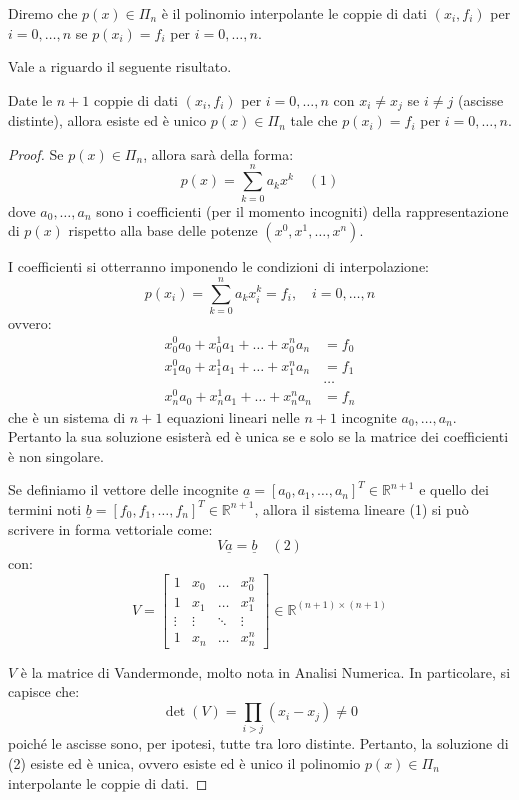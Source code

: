 \begin{definition}
Diremo che $p(x) \in \Pi_n$ è il polinomio interpolante le coppie di dati $(x_i, f_i)$ per $i=0,\dots,n$ se $p(x_i) = f_i$ per $i=0,\dots,n$.
\end{definition}

Vale a riguardo il seguente risultato.

\begin{teorema}
Date le $n+1$ coppie di dati $(x_i, f_i)$ per $i=0,\dots,n$ con $x_i \neq x_j$ se $i \neq j$ (ascisse distinte), allora esiste ed è unico $p(x) \in \Pi_n$ tale che $p(x_i) = f_i$ per $i=0,\dots,n$.
\end{teorema}

\begin{proof}
Se $p(x) \in \Pi_n$, allora sarà della forma:
$$p(x) = \sum_{k=0}^{n} a_k x^k \quad (1)$$
dove $a_0, \dots, a_n$ sono i coefficienti (per il momento incogniti) della rappresentazione di $p(x)$ rispetto alla base delle potenze $(x^0, x^1, \dots, x^n)$. 

I coefficienti si otterranno imponendo le condizioni di interpolazione:
$$p(x_i) = \sum_{k=0}^{n} a_k x_i^k = f_i, \quad i=0,\dots,n$$
ovvero:
\begin{align*}
x_0^0 a_0 + x_0^1 a_1 + \dots + x_0^n a_n &= f_0 \\
x_1^0 a_0 + x_1^1 a_1 + \dots + x_1^n a_n &= f_1 \\
&\dots \\
x_n^0 a_0 + x_n^1 a_1 + \dots + x_n^n a_n &= f_n
\end{align*}
che è un sistema di $n+1$ equazioni lineari nelle $n+1$ incognite $a_0, \dots, a_n$. Pertanto la sua soluzione esisterà ed è unica se e solo se la matrice dei coefficienti è non singolare.

Se definiamo il vettore delle incognite $\underline{a} = [a_0, a_1, \dots, a_n]^T \in \mathbb{R}^{n+1}$ e quello dei termini noti $\underline{b} = [f_0, f_1, \dots, f_n]^T \in \mathbb{R}^{n+1}$, allora il sistema lineare (1) si può scrivere in forma vettoriale come:
$$V \underline{a} = \underline{b} \quad (2)$$
con:
$$V = \begin{bmatrix}
1 & x_0 & \dots & x_0^n \\
1 & x_1 & \dots & x_1^n \\
\vdots & \vdots & \ddots & \vdots \\
1 & x_n & \dots & x_n^n
\end{bmatrix} \in \mathbb{R}^{(n+1) \times (n+1)}$$

$V$ è la matrice di Vandermonde, molto nota in Analisi Numerica. In particolare, si capisce che:
$$\det(V) = \prod_{i>j} (x_i - x_j) \neq 0$$
poiché le ascisse sono, per ipotesi, tutte tra loro distinte. Pertanto, la soluzione di (2) esiste ed è unica, ovvero esiste ed è unico il polinomio $p(x) \in \Pi_n$ interpolante le coppie di dati.
\end{proof}

